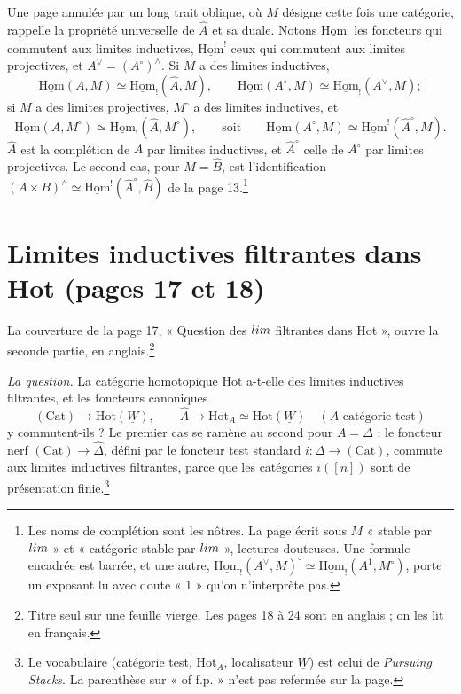 \documentclass[11pt,a4paper]{article}
\begin{document}
Une page annulée par un long trait oblique, où $M$ désigne cette fois une
catégorie, rappelle la propriété universelle de $\widehat{A}$ et sa duale.
Notons $\underline{\mathrm{Hom}}_{!}$ les foncteurs qui commutent aux limites
inductives, $\underline{\mathrm{Hom}}^{!}$ ceux qui commutent aux limites
projectives, et $A^{\vee} = (A^{\circ})^{\wedge}$. Si $M$ a des limites
inductives,
\[
\underline{\mathrm{Hom}}(A, M) \simeq \underline{\mathrm{Hom}}_{!}(\widehat{A},
M), \qquad
\underline{\mathrm{Hom}}(A^{\circ}, M) \simeq
\underline{\mathrm{Hom}}_{!}(A^{\vee}, M) ;
\]
si $M$ a des limites projectives, $M^{\circ}$ a des limites inductives, et
\[
\underline{\mathrm{Hom}}(A, M^{\circ}) \simeq
\underline{\mathrm{Hom}}_{!}(\widehat{A}, M^{\circ}), \qquad\text{soit}\qquad
\underline{\mathrm{Hom}}(A^{\circ}, M) \simeq
\underline{\mathrm{Hom}}^{!}(\widehat{A}^{\circ}, M).
\]
$\widehat{A}$ est la complétion de $A$ par limites inductives, et
$\widehat{A}^{\circ}$ celle de $A^{\circ}$ par limites projectives. Le second
cas, pour $M = \widehat{B}$, est l'identification $(A \times B)^{\wedge}
\simeq \underline{\mathrm{Hom}}^{!}(\widehat{A}^{\circ}, \widehat{B})$ de la
page 13.\footnote{Les noms de complétion sont les nôtres. La page écrit sous
$M$ « stable par $\varinjlim$ » et « catégorie stable par $\varprojlim$ »,
lectures douteuses. Une formule encadrée est barrée, et une autre,
$\underline{\mathrm{Hom}}_{!}(A^{\vee}, M)^{\circ} \simeq
\underline{\mathrm{Hom}}_{!}(A^{1}, M^{\circ})$, porte un exposant lu avec
doute « 1 » qu'on n'interprète pas.}

\section*{Limites inductives filtrantes dans Hot (pages 17 et 18)}

La couverture de la page 17, « Question des $\varinjlim$ filtrantes dans
Hot », ouvre la seconde partie, en anglais.\footnote{Titre seul sur une
feuille vierge. Les pages 18 à 24 sont en anglais ; on les lit en
français.}

\emph{La question.} La catégorie homotopique $\mathrm{Hot}$ a-t-elle des
limites inductives filtrantes, et les foncteurs canoniques
\[
(\mathrm{Cat}) \longrightarrow \mathrm{Hot}(\underline{W}), \qquad
\widehat{A} \longrightarrow \mathrm{Hot}_{A} \simeq \mathrm{Hot}(\underline{W})
\quad (A \text{ catégorie test})
\]
y commutent-ils ? Le premier cas se ramène au second pour $A = \Delta$ : le
foncteur nerf $(\mathrm{Cat}) \to \widehat{\Delta}$, défini par le foncteur
test standard $i : \Delta \to (\mathrm{Cat})$, commute aux limites inductives
filtrantes, parce que les catégories $i([n])$ sont de présentation finie.\footnote{Le
vocabulaire (catégorie test, $\mathrm{Hot}_{A}$, localisateur
$\underline{W}$) est celui de \emph{Pursuing Stacks}. La parenthèse sur
« of f.p. » n'est pas refermée sur la page.}
\end{document}
